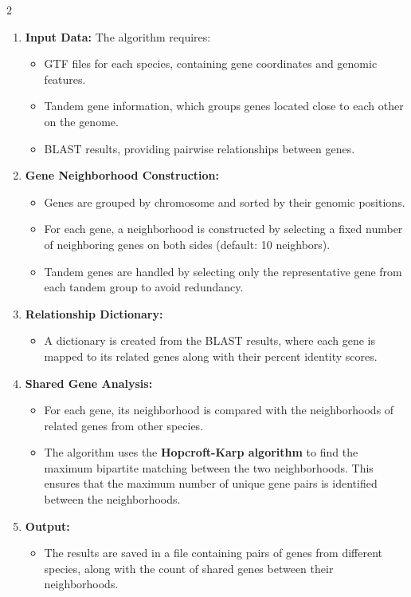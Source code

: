 2\documentclass{article}
\begin{document}
\begin{enumerate}
    \item \textbf{Input Data:} The algorithm requires:
    \begin{itemize}
        \item GTF files for each species, containing gene coordinates and genomic features.
        \item Tandem gene information, which groups genes located close to each other on the genome.
        \item BLAST results, providing pairwise relationships between genes.
    \end{itemize}

    \item \textbf{Gene Neighborhood Construction:}
    \begin{itemize}
        \item Genes are grouped by chromosome and sorted by their genomic positions.
        \item For each gene, a neighborhood is constructed by selecting a fixed number of neighboring genes on both sides (default: 10 neighbors).
        \item Tandem genes are handled by selecting only the representative gene from each tandem group to avoid redundancy.
    \end{itemize}

    \item \textbf{Relationship Dictionary:}
    \begin{itemize}
        \item A dictionary is created from the BLAST results, where each gene is mapped to its related genes along with their percent identity scores.
    \end{itemize}

    \item \textbf{Shared Gene Analysis:}
    \begin{itemize}
        \item For each gene, its neighborhood is compared with the neighborhoods of related genes from other species.
        \item The algorithm uses the \textbf{Hopcroft-Karp algorithm} to find the maximum bipartite matching between the two neighborhoods. This ensures that the maximum number of unique gene pairs is identified between the neighborhoods.
    \end{itemize}

    \item \textbf{Output:}
    \begin{itemize}
        \item The results are saved in a file containing pairs of genes from different species, along with the count of shared genes between their neighborhoods.
    \end{itemize}
\end{enumerate}
\end{document}
